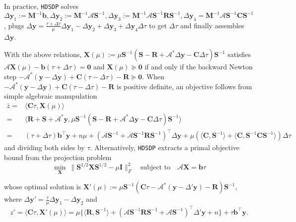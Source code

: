 In practice, {{\texttt{HDSDP}}} solves $\Delta \mathbf{y}_1 := \mathbf{M}^{- 1} \mathbf{b},
\Delta \mathbf{y}_2 := \mathbf{M}^{- 1} \mathcal{A} \mathbf{S}^{- 1}, \Delta \mathbf{y}_3 := \mathbf{M}^{- 1} \mathcal{A}
\mathbf{S}^{- 1} \mathbf{R} \mathbf{S}^{- 1}, \Delta \mathbf{y}_4 = \mathbf{M}^{- 1} \mathcal{A} \mathbf{S}^{- 1} \mathbf{C} \mathbf{S}^{-
1}$, plugs $\Delta \mathbf{y} = \frac{\tau + \Delta \tau}{\mu} \Delta \mathbf{y}_1 - \Delta
\mathbf{y}_2 + \Delta \mathbf{y}_3 + \Delta \mathbf{y}_4 \Delta \tau$ to get $\Delta \tau$ and finally assembles $\Delta \mathbf{y}$.

 With the above relations, $\mathbf{X} (\mu) := \mu \mathbf{S}^{- 1}
( \mathbf{S} - \mathbf{R} +\mathcal{A}^{\ast} \Delta \mathbf{y} - \mathbf{C} \Delta \tau ) \mathbf{S}^{-
1}$ satisfies $\mathcal{A} \mathbf{X} (\mu) - \mathbf{b} (\tau + \Delta \tau) = \textbf{0}$ and $\mathbf{X} (\mu)
\succeq \textbf{0}$ if and only if the backward Newton step $-\mathcal{A}^{\ast} ( \mathbf{y} - \Delta \mathbf{y} ) + \mathbf{C} (\tau
- \Delta \tau) - \mathbf{R} \succeq \textbf{0}$. When $-\mathcal{A}^{\ast} ( \mathbf{y} -
\Delta \mathbf{y} ) + \mathbf{C} (\tau - \Delta \tau) - \mathbf{R}$ is positive definite, an
objective follows from simple algebraic manupulation
\begin{align*}
\bar{z}  ={} & \langle \mathbf{C} \tau, \mathbf{X} (\mu) \rangle\\
	  ={} & \langle \mathbf{R} + \mathbf{S} + \mathcal{A}^{\ast} \mathbf{y}, \mu \mathbf{S}^{- 1} ( \mathbf{S} - \mathbf{R}
  +\mathcal{A}^{\ast} \Delta \mathbf{y} - \mathbf{C} \Delta \tau ) \mathbf{S}^{- 1}
  \rangle\\
  ={} & (\tau + \Delta \tau) \mathbf{b}^{\top} \mathbf{y} + n \mu + ( \mathcal{A} \mathbf{S}^{- 1} +
  \mathcal{A} \mathbf{S}^{- 1} \mathbf{R} \mathbf{S}^{- 1} )^{\top} \Delta \mathbf{y} + \mu (
  \langle \mathbf{C}, \mathbf{S}^{- 1} \rangle + \langle \mathbf{C}, \mathbf{S}^{- 1} \mathbf{C}
  \mathbf{S}^{- 1} \rangle ) \Delta \tau
\end{align*}
and dividing both sides by $\tau$. Alternatively, {{\texttt{HDSDP}}} extracts a primal
objective bound from the projection problem
\[   \min_{\mathbf{X}} ~ \| \mathbf{S}^{1 / 2} \mathbf{X} \mathbf{S}^{1 / 2} - \mu \mathbf{I} \|_F^2 \quad \text{subject to} \quad \mathcal{A} \mathbf{X} = \mathbf{b} \tau \]

whose optimal solution is $\mathbf{X}' (\mu) := \mu \mathbf{S}^{- 1} ( \mathbf{C} \tau -
\mathcal{A}^{\ast} ( \mathbf{y} - \Delta' \mathbf{y} ) - \mathbf{R} ) \mathbf{S}^{- 1}$, where
$\Delta \mathbf{y}' = \frac{\tau}{\mu} \Delta \mathbf{y}_1 - \Delta \mathbf{y}_2$ and
\[ z' = \langle \mathbf{C} \tau, \mathbf{X}' (\mu) \rangle = \mu \{
   \langle \mathbf{R}, \mathbf{S}^{- 1} \rangle + ( \mathcal{A} \mathbf{S}^{- 1} \mathbf{R}
   \mathbf{S}^{- 1} + \mathcal{A} \mathbf{S}^{- 1})^{\top} \Delta' \mathbf{y} + n \} + \tau
   \mathbf{b}^{\top} \mathbf{y} . \]

